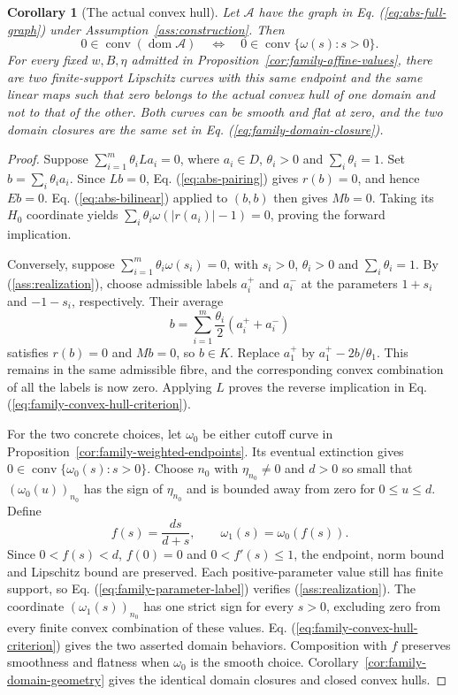 \documentclass[11pt]{article}
\newcommand{\dom}{\operatorname{dom}}
\newtheorem{corollary}{Corollary}
\theoremstyle{definition}
\theoremstyle{remark}
\begin{document}
\begin{corollary}[The actual convex hull]
\label{cor:family-convex-hull}
Let $\mathcal A$ have the graph in Eq. (\ref{eq:abs-full-graph}) under Assumption~\ref{ass:construction}. Then
\begin{equation}
0\in\operatorname{conv}(\dom\mathcal A)
\quad\Longleftrightarrow\quad
0\in\operatorname{conv}\{\omega(s):s>0\}.
\label{eq:family-convex-hull-criterion}
\end{equation}
For every fixed $w,B,\eta$ admitted in Proposition~\ref{cor:family-affine-values}, there are two finite-support Lipschitz curves with this same endpoint and the same linear maps such that zero belongs to the actual convex hull of one domain and not to that of the other. Both curves can be smooth and flat at zero, and the two domain closures are the same set in Eq. (\ref{eq:family-domain-closure}).
\end{corollary}
\begin{proof}
Suppose $\sum_{i=1}^m\theta_iLa_i=0$, where $a_i\in D$, $\theta_i>0$ and $\sum_i\theta_i=1$. Set $b=\sum_i\theta_i a_i$. Since $Lb=0$, Eq. (\ref{eq:abs-pairing}) gives $r(b)=0$, and hence $Eb=0$. Eq. (\ref{eq:abs-bilinear}) applied to $(b,b)$ then gives $Mb=0$. Taking its $H_0$ coordinate yields $\sum_i\theta_i\omega(|r(a_i)|-1)=0$, proving the forward implication.

Conversely, suppose $\sum_{i=1}^m\theta_i\omega(s_i)=0$, with $s_i>0$, $\theta_i>0$ and $\sum_i\theta_i=1$. By \textup{(\ref{ass:realization})}, choose admissible labels $a_i^+$ and $a_i^-$ at the parameters $1+s_i$ and $-1-s_i$, respectively. Their average
\[
b=\sum_{i=1}^m\frac{\theta_i}{2}(a_i^++a_i^-)
\]
satisfies $r(b)=0$ and $Mb=0$, so $b\in K$. Replace $a_1^+$ by $a_1^+-2b/\theta_1$. This remains in the same admissible fibre, and the corresponding convex combination of all the labels is now zero. Applying $L$ proves the reverse implication in Eq. (\ref{eq:family-convex-hull-criterion}).

For the two concrete choices, let $\omega_0$ be either cutoff curve in Proposition~\ref{cor:family-weighted-endpoints}. Its eventual extinction gives $0\in\operatorname{conv}\{\omega_0(s):s>0\}$. Choose $n_0$ with $\eta_{n_0}\ne0$ and $d>0$ so small that $(\omega_0(u))_{n_0}$ has the sign of $\eta_{n_0}$ and is bounded away from zero for $0\le u\le d$. Define
\begin{equation}
f(s)=\frac{ds}{d+s},\qquad \omega_1(s)=\omega_0(f(s)).
\label{eq:family-bounded-clock}
\end{equation}
Since $0<f(s)<d$, $f(0)=0$ and $0<f'(s)\le1$, the endpoint, norm bound and Lipschitz bound are preserved. Each positive-parameter value still has finite support, so Eq. (\ref{eq:family-parameter-label}) verifies \textup{(\ref{ass:realization})}. The coordinate $(\omega_1(s))_{n_0}$ has one strict sign for every $s>0$, excluding zero from every finite convex combination of these values. Eq. (\ref{eq:family-convex-hull-criterion}) gives the two asserted domain behaviors. Composition with $f$ preserves smoothness and flatness when $\omega_0$ is the smooth choice. Corollary~\ref{cor:family-domain-geometry} gives the identical domain closures and closed convex hulls.
\end{proof}
\end{document}
